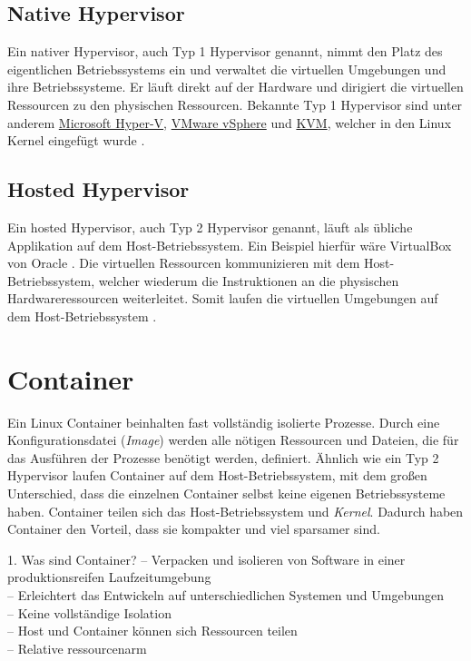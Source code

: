 \subsection{Native Hypervisor}
Ein nativer Hypervisor, auch Typ 1 Hypervisor genannt, nimmt den Platz des eigentlichen Betriebssystems ein
und verwaltet die virtuellen Umgebungen und ihre Betriebssysteme. Er läuft direkt
auf der Hardware und dirigiert die virtuellen Ressourcen zu den physischen Ressourcen.
Bekannte Typ 1 Hypervisor sind unter anderem
\href{https://docs.microsoft.com/de-de/virtualization/hyper-v-on-windows/}{Microsoft Hyper-V},
\href{https://www.vmware.com/de/products/vsphere.html}{VMware vSphere} und
\href{https://www.linux-kvm.org/page/Main_Page}{KVM}, welcher in den Linux
Kernel eingefügt wurde \cite{RedHatHypervisor}.

\subsection{Hosted Hypervisor}
Ein hosted Hypervisor, auch Typ 2 Hypervisor genannt, läuft als übliche
Applikation auf dem Host-Betriebssystem.
Ein Beispiel hierfür wäre VirtualBox von Oracle \cite{VirtualBox}.
Die virtuellen Ressourcen kommunizieren mit dem Host-Betriebssystem,
welcher wiederum die Instruktionen an die physischen Hardwareressourcen weiterleitet.
Somit laufen die virtuellen Umgebungen auf dem Host-Betriebssystem \cite{RedHatHypervisor}.

\section{Container}
Ein Linux Container beinhalten fast vollständig isolierte Prozesse.
Durch eine Konfigurationsdatei (\textit{Image}) werden alle nötigen Ressourcen und Dateien,
die für das Ausführen der Prozesse benötigt werden, definiert. Ähnlich wie ein Typ 2 Hypervisor
laufen Container auf dem Host-Betriebssystem, mit dem großen Unterschied, dass die einzelnen
Container selbst keine eigenen Betriebssysteme haben. Container teilen sich das
Host-Betriebssystem und \textit{Kernel}.
Dadurch haben Container den Vorteil, dass sie kompakter und viel sparsamer sind.

1. Was sind Container?
-- Verpacken und isolieren von Software in einer produktionsreifen Laufzeitumgebung\\
-- Erleichtert das Entwickeln auf unterschiedlichen Systemen und Umgebungen\\
-- Keine vollständige Isolation\\
-- Host und Container können sich Ressourcen teilen\\
-- Relative ressourcenarm\\

